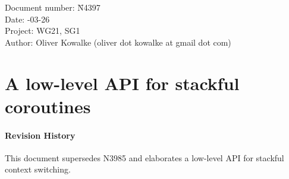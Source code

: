 \documentclass[paper=A4,pagesize,DIV=15]{scrartcl}
\begin{document}
\small
\begin{tabbing}
    Document number: \= N4397\\
    Date:            -03-26\\
    Project:         \> WG21, SG1\\
    Author:          \> Oliver Kowalke (oliver dot kowalke at gmail dot com)\\
\end{tabbing}

\section*{A low-level API for stackful coroutines}


\tableofcontents


\paragraph*{Revision History}
This document supersedes N3985 and elaborates a low-level API for stackful
context switching.













\end{document}
